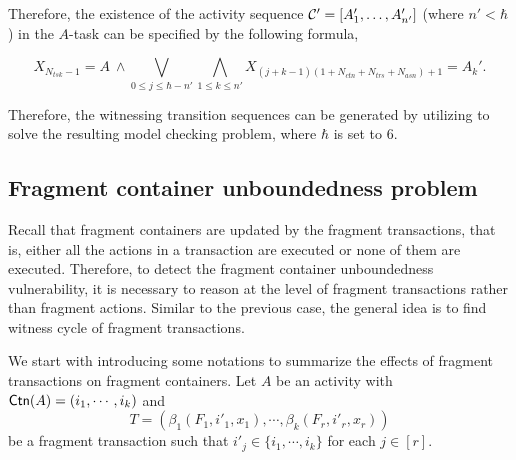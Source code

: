 Therefore, the existence of the activity sequence ${\mathcal{C} }' = [A_1',\dots,A_{n'}']$ (where $n'<\hbar$) in the $A$-task can be specified by the following formula,

$$
X_{N_{tsk} - 1} = A\ \wedge 
    \bigvee \limits_{0 \le j \le \hbar - n'}
    \bigwedge \limits_{1 \le k \le n'}
X_{(j+k-1) (1+N_{ctn}+N_{trs}+N_{asn}) +1} = A_{k}'.
$$ 

Therefore, the witnessing transition sequences can be generated by utilizing  {\nuxmv} to solve the resulting model checking problem, where $\hbar$ is set to $6$.



\subsection{Fragment container unboundedness problem}\label{sec:frag-unbound}

Recall that fragment containers are updated by the fragment transactions, that is, either all the actions in a transaction are executed or none of them are executed. Therefore, to detect the fragment container unboundedness vulnerability, it is necessary to reason at the level of fragment transactions rather than fragment actions.  
%
Similar  to the previous case, %
the general idea is to find %
witness cycle of fragment transactions. 

We start with introducing some notations to summarize the effects of fragment transactions on fragment containers.
%
Let $A$ be an activity with ${\sf Ctn}(A) = (i_1, \cdots, i_k)$ and 
$$T = (\beta_1(F_1, i'_1, x_1), \cdots, \beta_k(F_r, i'_r, x_r))$$ 
be a fragment transaction such that $i'_j \in \{i_1, \cdots, i_k\}$ for each $j \in [r]$. 

